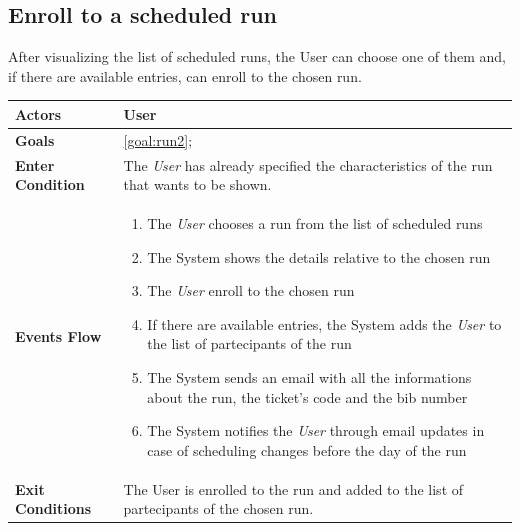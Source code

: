   \subsection{Enroll to a scheduled run}
After visualizing the list of scheduled runs, the User can choose one of them and, if there are available entries, can enroll to the chosen run. 

\begin{table}[H]
	\centering
    
    \begin{tabular}{|p{3.5cm}|p{10.3cm}|}
    
    \hline
    \textbf{\large{Actors}}  			& \tabitem User 	\\
    				 					
    \hline
    \textbf{\large{Goals}} 				& \ref{goal:run2};\\
    
    \hline
    \textbf{\large{Enter Condition}}	& The \emph{User} has already specified the characteristics of the run that wants to be shown.		\\
    
    \hline
    \textbf{\large{Events Flow}}		& \begin{enumerate}[leftmargin=0.5cm]
                                          	\item The \emph{User} chooses a run from the list of scheduled runs 
                                          	 \item The System shows the details relative to the chosen run
                                            \item The \emph{User} enroll to the chosen run
                                            \item If there are available entries, the System adds the \emph{User} to the list of partecipants of the run
                                             \item The System sends an email with all the informations about the run, the ticket's code and the bib number
                                              \item The System notifies the \emph{User} through email updates in case of scheduling changes before the day of the run
                                             \end{enumerate}
    										\\
    \hline
    \textbf{\large{Exit Conditions}}    & The User is enrolled to the run and added to the list of partecipants of the chosen run.  \\
    

\end{tabular}
\end{table}
